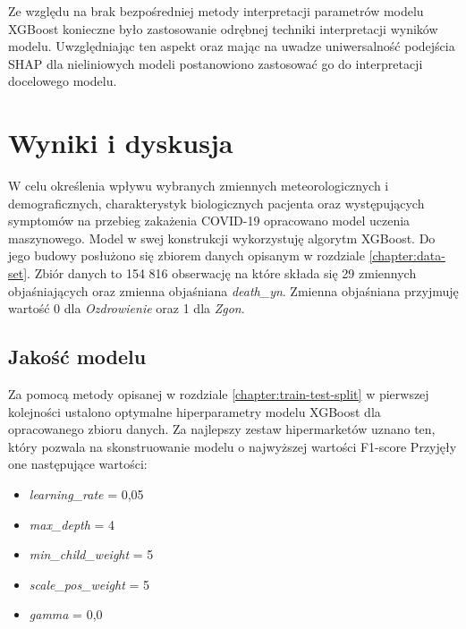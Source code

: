 \documentclass[polish, twoside, 12pt, a4paper]{article}
\theoremstyle{definition}
\theoremstyle{plain}
\theoremstyle{remark}
\begin{document}
Ze względu na brak bezpośredniej metody interpretacji parametrów modelu XGBoost konieczne było zastosowanie odrębnej techniki interpretacji wyników modelu. Uwzględniając ten aspekt oraz mając na uwadze uniwersalność podejścia SHAP dla nieliniowych modeli postanowiono zastosować go do interpretacji docelowego modelu.


\clearpage
\section{Wyniki i dyskusja}


W celu określenia wpływu wybranych zmiennych meteorologicznych i demograficznych, charakterystyk biologicznych pacjenta oraz występujących symptomów na przebieg zakażenia COVID-19 opracowano model uczenia maszynowego. Model w swej konstrukcji wykorzystuję algorytm XGBoost. Do jego budowy posłużono się zbiorem danych opisanym w rozdziale \ref{chapter:data-set}. Zbiór danych to 154 816 obserwację na które składa się 29 zmiennych objaśniających oraz zmienna objaśniana \emph{death\_yn}. Zmienna objaśniana przyjmuję wartość 0 dla \emph{Ozdrowienie} oraz 1 dla \emph{Zgon}.

\subsection{Jakość modelu}

Za pomocą metody opisanej w rozdziale \ref{chapter:train-test-split} w pierwszej kolejności ustalono optymalne hiperparametry modelu XGBoost dla opracowanego zbioru danych. Za najlepszy zestaw hipermarketów uznano ten, który pozwala na skonstruowanie modelu o najwyższej wartości F1-score Przyjęły one następujące wartości:
\begin{itemize}
 \item \emph{learning\_rate} = 0,05
 \item \emph{max\_depth} = 4
 \item \emph{min\_child\_weight} = 5
 \item \emph{scale\_pos\_weight} = 5
 \item \emph{gamma} = 0,0
\end{itemize}
\end{document}
